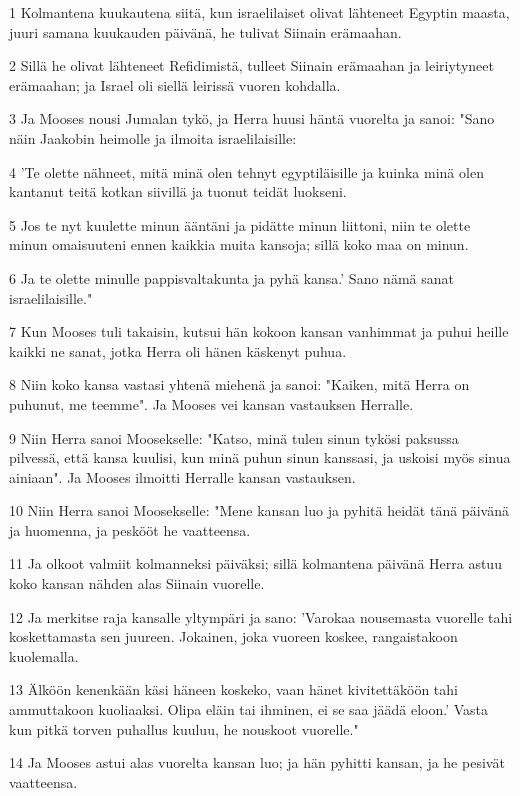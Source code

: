 \par 1 Kolmantena kuukautena siitä, kun israelilaiset olivat lähteneet Egyptin maasta, juuri samana kuukauden päivänä, he tulivat Siinain erämaahan.
\par 2 Sillä he olivat lähteneet Refidimistä, tulleet Siinain erämaahan ja leiriytyneet erämaahan; ja Israel oli siellä leirissä vuoren kohdalla.
\par 3 Ja Mooses nousi Jumalan tykö, ja Herra huusi häntä vuorelta ja sanoi: "Sano näin Jaakobin heimolle ja ilmoita israelilaisille:
\par 4 'Te olette nähneet, mitä minä olen tehnyt egyptiläisille ja kuinka minä olen kantanut teitä kotkan siivillä ja tuonut teidät luokseni.
\par 5 Jos te nyt kuulette minun ääntäni ja pidätte minun liittoni, niin te olette minun omaisuuteni ennen kaikkia muita kansoja; sillä koko maa on minun.
\par 6 Ja te olette minulle pappisvaltakunta ja pyhä kansa.' Sano nämä sanat israelilaisille."
\par 7 Kun Mooses tuli takaisin, kutsui hän kokoon kansan vanhimmat ja puhui heille kaikki ne sanat, jotka Herra oli hänen käskenyt puhua.
\par 8 Niin koko kansa vastasi yhtenä miehenä ja sanoi: "Kaiken, mitä Herra on puhunut, me teemme". Ja Mooses vei kansan vastauksen Herralle.
\par 9 Niin Herra sanoi Moosekselle: "Katso, minä tulen sinun tykösi paksussa pilvessä, että kansa kuulisi, kun minä puhun sinun kanssasi, ja uskoisi myös sinua ainiaan". Ja Mooses ilmoitti Herralle kansan vastauksen.
\par 10 Niin Herra sanoi Moosekselle: "Mene kansan luo ja pyhitä heidät tänä päivänä ja huomenna, ja peskööt he vaatteensa.
\par 11 Ja olkoot valmiit kolmanneksi päiväksi; sillä kolmantena päivänä Herra astuu koko kansan nähden alas Siinain vuorelle.
\par 12 Ja merkitse raja kansalle yltympäri ja sano: 'Varokaa nousemasta vuorelle tahi koskettamasta sen juureen. Jokainen, joka vuoreen koskee, rangaistakoon kuolemalla.
\par 13 Älköön kenenkään käsi häneen koskeko, vaan hänet kivitettäköön tahi ammuttakoon kuoliaaksi. Olipa eläin tai ihminen, ei se saa jäädä eloon.' Vasta kun pitkä torven puhallus kuuluu, he nouskoot vuorelle."
\par 14 Ja Mooses astui alas vuorelta kansan luo; ja hän pyhitti kansan, ja he pesivät vaatteensa.
